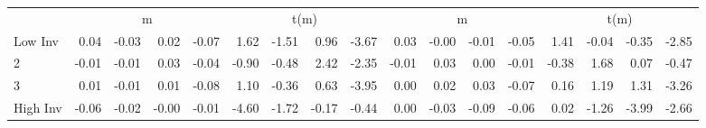 \begin{table}[!ht]
\begin{tabular}{lrrrrrrrrrrrrrrrr}
  
    
      & \multicolumn{4}{c}{m} & \multicolumn{4}{c}{t(m)}
    
      & \multicolumn{4}{c}{m} & \multicolumn{4}{c}{t(m)}
    
    \\
      \cmidrule(r){2-5} \cmidrule(r){6-9} \cmidrule(r){10-13} \cmidrule(r){14-17}

    Low Inv   & 0.04  & -0.03  & 0.02  & -0.07  & 1.62  & -1.51  & 0.96  & -3.67  & 0.03  & -0.00  & -0.01  & -0.05  & 1.41  & -0.04  & -0.35  & -2.85  \\
           2  & -0.01  & -0.01  & 0.03  & -0.04  & -0.90  & -0.48  & 2.42  & -2.35  & -0.01  & 0.03  & 0.00  & -0.01  & -0.38  & 1.68  & 0.07  & -0.47  \\
           3  & 0.01  & -0.01  & 0.01  & -0.08  & 1.10  & -0.36  & 0.63  & -3.95  & 0.00  & 0.02  & 0.03  & -0.07  & 0.16  & 1.19  & 1.31  & -3.26  \\
    High Inv  & -0.06  & -0.02  & -0.00  & -0.01  & -4.60  & -1.72  & -0.17  & -0.44  & 0.00  & -0.03  & -0.09  & -0.06  & 0.02  & -1.26  & -3.99  & -2.66  \\

  

  \bottomrule
\end{tabular}
\label{tbl:32_Size_BM_Inv_C1997}
\end{table}